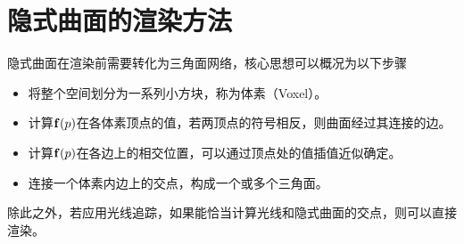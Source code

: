 \section{隐式曲面的渲染方法}

隐式曲面在渲染前需要转化为三角面网络，核心思想可以概况为以下步骤
\begin{itemize}
    \item 将整个空间划分为一系列小方块，称为体素（Voxel）。
    \item 计算$\vb{f}(p)$在各体素顶点的值，若两顶点的符号相反，则曲面经过其连接的边。
    \item 计算$\vb{f}(p)$在各边上的相交位置，可以通过顶点处的值插值近似确定。
    \item 连接一个体素内边上的交点，构成一个或多个三角面。
\end{itemize}

除此之外，若应用光线追踪，如果能恰当计算光线和隐式曲面的交点，则可以直接渲染。